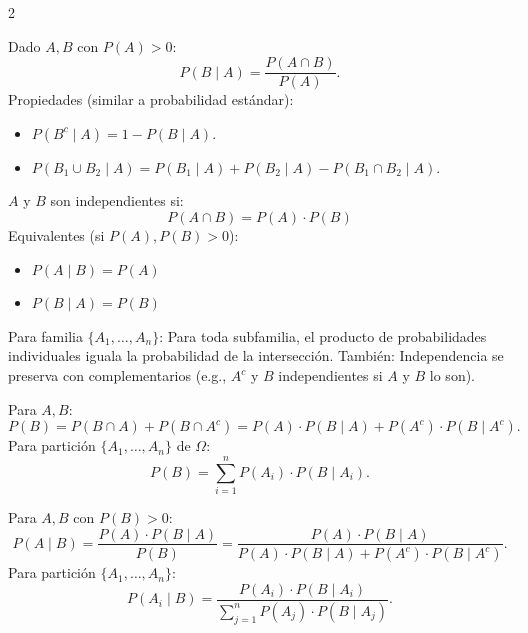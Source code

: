 \documentclass[10pt,a4paper]{article}
\begin{document}
\begin{multicols}{2}
    \begin{tcolorbox}[title=Probabilidad Condicionada, equal height group=PROB2]
        Dado \(A, B\) con \(P(A) > 0\):
        \[
            P(B \mid A) = \frac{P(A \cap B)}{P(A)}.
        \]
        Propiedades (similar a probabilidad estándar):
        \begin{itemize}
            \item \(P(B^c \mid A) = 1 - P(B \mid A)\).
            \item \(P(B_1 \cup B_2 \mid A) = P(B_1 \mid A) + P(B_2 \mid A) - P(B_1 \cap B_2 \mid A)\).
        \end{itemize}
    \end{tcolorbox}
    \begin{tcolorbox}[title=Independencia, equal height group=PROB2]
        \(A\) y \(B\) son independientes si:
        \[
            P(A \cap B) = P(A) \cdot P(B)
        \]
        Equivalentes (si \(P(A), P(B) > 0\)):
        \begin{itemize}
            \item \(P(A \mid B) = P(A)\)
            \item \(P(B \mid A) = P(B)\)
        \end{itemize}
        Para familia \(\{A_1, \dots, A_n\}\): Para toda subfamilia, el producto de probabilidades individuales iguala la probabilidad de la intersección.
        También: Independencia se preserva con complementarios (e.g., \(A^c\) y \(B\) independientes si \(A\) y \(B\) lo son).
    \end{tcolorbox}
\end{multicols}

\begin{tcolorbox}[title=Probabilidad Total]
    Para \(A, B\):
    \[
        P(B) = P(B \cap A) + P(B \cap A^c) = P(A) \cdot P(B \mid A) + P(A^c) \cdot P(B \mid A^c).
    \]
    Para partición \(\{A_1, \dots, A_n\}\) de \(\Omega\):
    \[
        P(B) = \sum_{i=1}^n P(A_i) \cdot P(B \mid A_i).
    \]
\end{tcolorbox}

\begin{tcolorbox}[title=Teorema de Bayes]
    Para \(A, B\) con \(P(B) > 0\):
    \[
        P(A \mid B) = \frac{P(A) \cdot P(B \mid A)}{P(B)} = \frac{P(A) \cdot P(B \mid A)}{P(A) \cdot P(B \mid A) + P(A^c) \cdot P(B \mid A^c)}.
    \]
    Para partición \(\{A_1, \dots, A_n\}\):
    \[
        P(A_i \mid B) = \frac{P(A_i) \cdot P(B \mid A_i)}{\sum_{j=1}^n P(A_j) \cdot P(B \mid A_j)}.
    \]
\end{tcolorbox}
\end{document}
